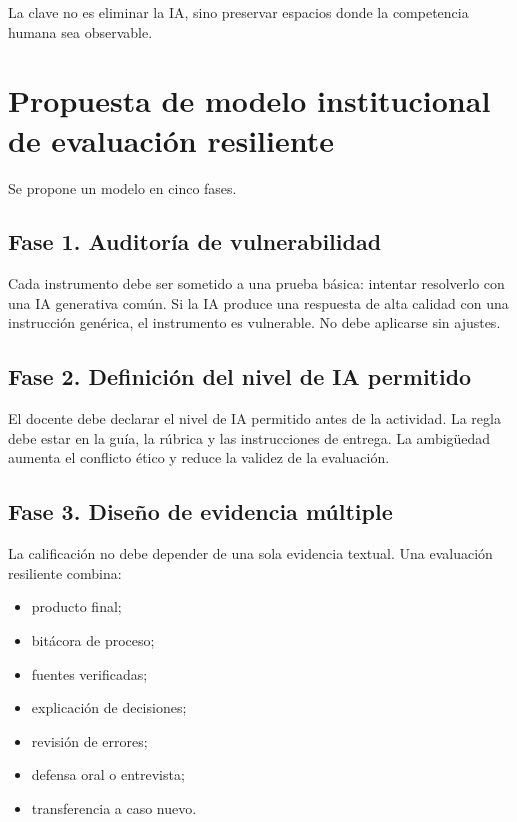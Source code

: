 \documentclass[
  spanish,
  letterpaper,
  DIV=11,
  numbers=noendperiod]{scrartcl}
\providecommand{\tightlist}{%
  \setlength{\itemsep}{0pt}\setlength{\parskip}{0pt}}
\begin{document}
La clave no es eliminar la IA, sino preservar espacios donde la
competencia humana sea observable.

\section{Propuesta de modelo institucional de evaluación
resiliente}\label{propuesta-de-modelo-institucional-de-evaluaciuxf3n-resiliente}

Se propone un modelo en cinco fases.

\subsection{Fase 1. Auditoría de
vulnerabilidad}\label{fase-1.-auditoruxeda-de-vulnerabilidad}

Cada instrumento debe ser sometido a una prueba básica: intentar
resolverlo con una IA generativa común. Si la IA produce una respuesta
de alta calidad con una instrucción genérica, el instrumento es
vulnerable. No debe aplicarse sin ajustes.

\subsection{Fase 2. Definición del nivel de IA
permitido}\label{fase-2.-definiciuxf3n-del-nivel-de-ia-permitido}

El docente debe declarar el nivel de IA permitido antes de la actividad.
La regla debe estar en la guía, la rúbrica y las instrucciones de
entrega. La ambigüedad aumenta el conflicto ético y reduce la validez de
la evaluación.

\subsection{Fase 3. Diseño de evidencia
múltiple}\label{fase-3.-diseuxf1o-de-evidencia-muxfaltiple}

La calificación no debe depender de una sola evidencia textual. Una
evaluación resiliente combina:

\begin{itemize}
\tightlist
\item
  producto final;
\item
  bitácora de proceso;
\item
  fuentes verificadas;
\item
  explicación de decisiones;
\item
  revisión de errores;
\item
  defensa oral o entrevista;
\item
  transferencia a caso nuevo.
\end{itemize}
\end{document}
